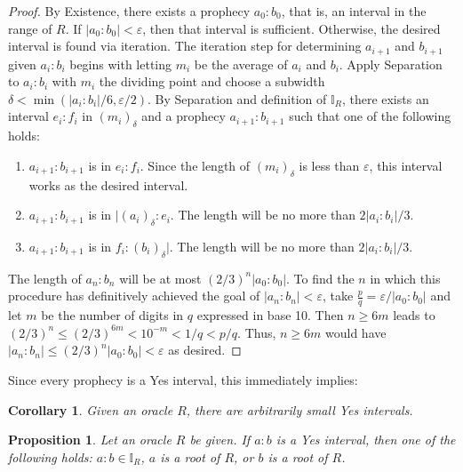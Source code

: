 \documentclass[12pt]{article}
\newtheorem{corollary}{Corollary}[section]
\newtheorem{proposition}{Proposition}[section]
\begin{document}
\begin{proof}
    By Existence, there exists a prophecy $a_0:b_0$, that is, an interval in the range of $R$. If $|a_0:b_0| < \varepsilon$, then that interval is sufficient. Otherwise, the desired interval is found via iteration. The iteration step for determining $a_{i+1}$ and $b_{i+1}$ given $a_i:b_i$ begins with letting $m_i$ be the average of $a_i$ and $b_i$. Apply Separation to $a_i:b_i$ with $m_i$ the dividing point and choose a subwidth $\delta < \min(|a_i:b_i|/6, \varepsilon /2)$. By Separation and definition of $\mathbb{I}_R$, there exists an interval $e_i:f_i$ in $(m_i)_\delta$ and a prophecy $a_{i+1}:b_{i+1}$ such that one of the following holds: 
    \begin{enumerate}
        \item $a_{i+1}:b_{i+1}$ is in $e_i:f_i$. Since the length of $(m_i)_\delta$ is less than $\varepsilon$, this interval works as the desired interval.  
        \item  $a_{i+1}:b_{i+1}$ is in $|(a_i)_\delta:e_i$. The length will be no more than $2|a_i:b_i|/3$.
        \item  $a_{i+1}:b_{i+1}$ is in $f_i:(b_i)_\delta|$. The length will be no more than $2|a_i:b_i|/3$.
    \end{enumerate}
    The length of $a_n:b_n$ will be at most $(2/3)^n |a_0:b_0|$. To find the $n$ in which this procedure has definitively achieved the goal of $|a_n:b_n|<\varepsilon$,  take $\frac{p}{q} = \varepsilon/|a_0:b_0|$ and let $m$ be the number of digits in $q$ expressed in base 10. Then $n \geq  6m$ leads to  $(2/3)^n \leq (2/3)^{6m} < 10^{-m} < 1/q < p/q$. Thus, $n \geq 6m$ would have $|a_n:b_n| \leq (2/3)^n |a_0:b_0| < \varepsilon$ as desired. 
\end{proof}

Since every prophecy is a Yes interval, this immediately implies:
\begin{corollary}
    Given an oracle $R$, there are arbitrarily small Yes intervals. 
\end{corollary}



\begin{proposition}\label{os:yescat}
    Let an oracle $R$ be given. If $a:b$ is a Yes interval, then one of the following holds: $a:b \in \mathbb{I}_R$, $a$ is a root of $R$, or $b$ is a root of $R$.
\end{proposition}
\end{document}
